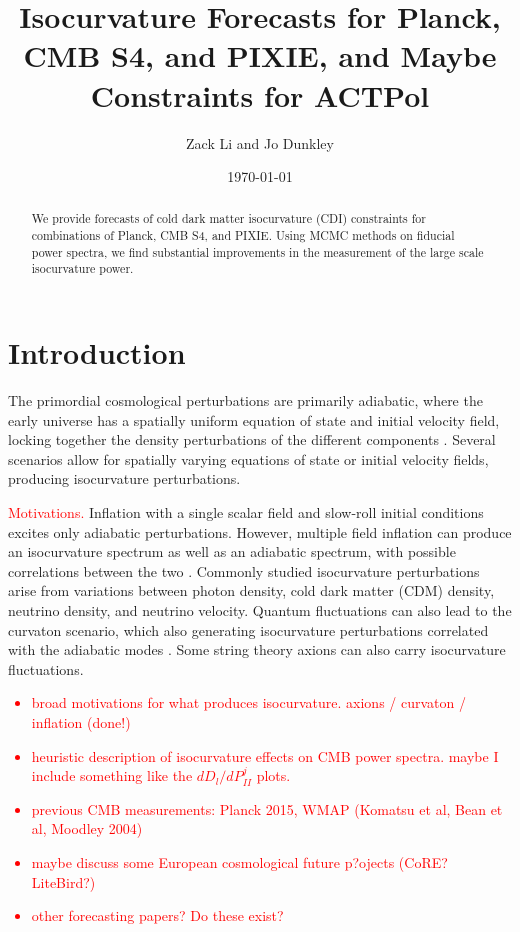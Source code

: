 \documentclass[11pt,a4paper]{emulateapj}
\newcommand\writingnote[1]{\textcolor{red}{#1}}
\begin{document}
\title{Isocurvature Forecasts for Planck, CMB S4, and PIXIE, and Maybe Constraints for ACTPol}
\author{Zack Li and Jo Dunkley}
\date{\today}


\begin{abstract}
We provide forecasts of cold dark matter isocurvature (CDI) constraints for combinations of Planck, CMB S4, and PIXIE. Using MCMC methods on fiducial power spectra, we find substantial improvements in the measurement of the large scale isocurvature power. 
\end{abstract}

\section{Introduction}

The primordial cosmological perturbations are primarily adiabatic, where the early universe has a spatially uniform equation of state and initial velocity field, locking together the density perturbations of the different components \cite{planck2013}.  Several scenarios allow for spatially varying equations of state or initial velocity fields, producing isocurvature perturbations. 

\writingnote{Motivations.}
Inflation with a single scalar field and slow-roll initial conditions excites only adiabatic perturbations. However, multiple field inflation can produce an isocurvature spectrum as well as an adiabatic spectrum, with possible correlations between the two \cite{langlois1999}. Commonly studied isocurvature perturbations arise from variations between photon density, cold dark matter (CDM) density, neutrino density, and neutrino velocity. Quantum fluctuations can also lead to the curvaton scenario, which also generating isocurvature perturbations correlated with the adiabatic modes \cite{something}. Some string theory axions can also carry isocurvature fluctuations.



\writingnote{
\begin{itemize}
\item broad motivations for what produces isocurvature. axions / curvaton / inflation (done!)
\item heuristic description of isocurvature effects on CMB power spectra. maybe I include something like the $dD_l/dP_{II}^j$ plots.
\item previous CMB measurements: Planck 2015, WMAP (Komatsu et al, Bean et al, Moodley 2004)
\item maybe discuss some European cosmological future p?ojects (CoRE? LiteBird?)
\item other forecasting papers? Do these exist?
\end{itemize}
}
\end{document}
